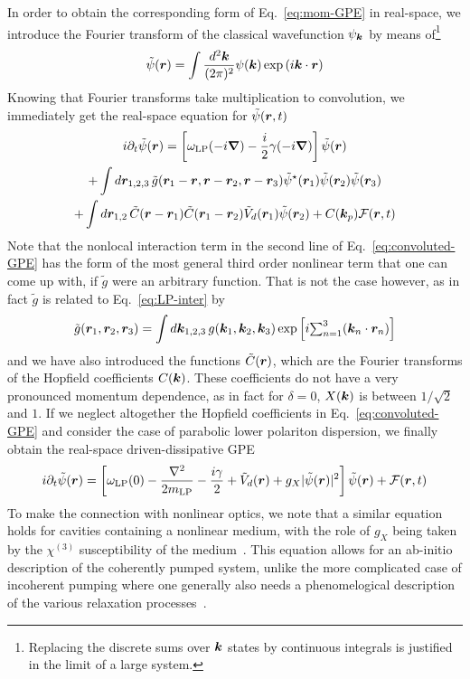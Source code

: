 In order to obtain the corresponding form of Eq.~\eqref{eq:mom-GPE} in
real-space, we introduce the Fourier transform of the classical
wavefunction $\psi_{\bm{k}}$ by means of\footnote{Replacing the discrete
  sums over $\bm{k}$ states by continuous integrals is justified in the
  limit of a large system.}
%
\begin{equation}\label{eq:fourier-psi}
  \tilde{\psi}(\bm{r}) = \int \frac{d^2\bm{k}}{(2\pi)^2} \psi(\bm{k}) \exp \left(i \bm{k} \cdot\bm{r} \right)
\end{equation}
% 
Knowing that Fourier transforms take multiplication to convolution, we
immediately get the real-space equation for $\tilde{\psi}(\bm{r}, t)$
\begin{multline}\label{eq:convoluted-GPE}
  i \partial_t \tilde{\psi}(\bm{r}) = \left[ \omega_{\text{LP}}(-i \bm{\nabla}) - \frac{i}{2} \gamma(-i \bm{\nabla}) \right] \tilde{\psi}(\bm{r})\\ + \int d\bm{r}_{1,2,3} \,\tilde{g}(\bm{r}_1 - \bm{r}, \bm{r} - \bm{r}_2, \bm{r} - \bm{r}_3) \tilde{\psi}^{\star}(\bm{r}_1) \tilde{\psi}(\bm{r}_2) \tilde{\psi}(\bm{r}_3)\\
+ \int d\bm{r}_{1,2} \,\tilde{C}(\bm{r} - \bm{r}_1) \tilde{C}(\bm{r}_1 - \bm{r}_2) \tilde{V}_d(\bm{r}_1) \tilde{\psi}(\bm{r}_2) + C(\bm{k}_p) \mathcal{F}(\bm{r},t)
\end{multline}
Note that the nonlocal interaction term in the second line of
Eq.~\eqref{eq:convoluted-GPE} has the form of the most general third
order nonlinear term that one can come up with, if $\tilde{g}$ were an
arbitrary function. That is not the case however, as in fact
$\tilde{g}$ is related to Eq.~\eqref{eq:LP-inter} by 
%
\begin{equation}\label{eq:convoluted-g}
  \tilde{g}(\bm{r}_1, \bm{r}_2, \bm{r}_3) = \int d\bm{k}_{1,2,3} \,g(\bm{k}_1,\bm{k}_2,\bm{k}_3) \exp \left[i \textstyle{\sum_{n=1}^3} (\bm{k}_n \cdot \bm{r}_n) \right]
\end{equation}
% 
and we have also introduced the functions $\tilde{C}(\bm{r})$, which are
the Fourier transforms of the Hopfield coefficients $C(\bm{k})$. These
coefficients do not have a very pronounced momentum dependence, as in
fact for $\delta = 0$, $X(\bm{k})$ is between $1/\sqrt{2}$ and $1$. If we
neglect altogether the Hopfield coefficients in
Eq.~\eqref{eq:convoluted-GPE} and consider the case of parabolic lower
polariton dispersion, we finally obtain the real-space
driven-dissipative GPE
%
\begin{equation}\label{eq:rspace-GPE}
  i \partial_t \tilde{\psi}(\bm{r}) = \left[ \omega_{\text{LP}}(0) - \frac{\nabla^2}{2m_{\text{LP}}} - \frac{i\gamma}{2}  + \tilde{V}_d(\bm{r}) + g_X \vert \tilde{\psi}(\bm{r}) \vert^2\right] \tilde{\psi}(\bm{r})
  + \mathcal{F}(\bm{r},t)
\end{equation}
% 
To make the connection with nonlinear optics, we note that a similar
equation holds for cavities containing a nonlinear medium, with the
role of $g_X$ being taken by the $\chi^{(3)}$ susceptibility of the
medium~\cite{boyd2003nonlinear}. This equation allows for an ab-initio
description of the coherently pumped system, unlike the more
complicated case of incoherent pumping where one generally also needs
a phenomelogical description of the various relaxation
processes~\cite{Keeling_2007}.



